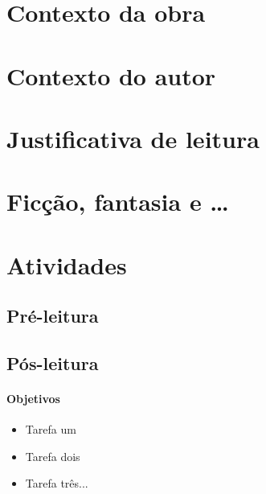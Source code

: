 \section{Contexto da obra}


\lipsum[1-4]


\section{Contexto do autor}

\lipsum[1-4]

\section{Justificativa de leitura}
\lipsum[2]

\section{Ficção, fantasia e …}
\lipsum[5-7]

\section{Atividades}

\subsection{Pré-leitura}

\lipsum[1]

\subsection{Pós-leitura}


\paragraph{Objetivos}

\begin{itemize}
\item Tarefa um
\item Tarefa dois
\item Tarefa três...
\end{itemize}


